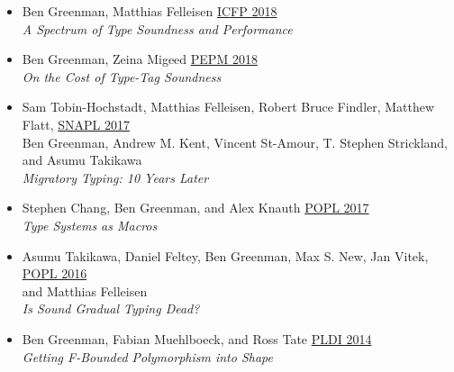 \documentclass[11pt]{article}
\begin{document}
\begin{itemize}
  Daniel Feltey, Ben Greenman, Christophe Scholliers, Robert Bruce Findler, \hfill \href{https://2018.splashcon.org/track/splash-2018-OOPSLA}{OOPSLA 2018} \\
  and Vincent St. Amour \\
  \emph{Collapsible Contracts: Fixing a Pathology of Gradual Typing} \hfill {}
\item
  Ben Greenman, Matthias Felleisen \hfill \href{https://icfp18.sigplan.org/}{ICFP 2018} \\
  \emph{A Spectrum of Type Soundness and Performance} \hfill {}
\item
  Ben Greenman, Zeina Migeed \hfill \href{https://popl18.sigplan.org/track/PEPM-2018}{PEPM 2018} \\
  \emph{On the Cost of Type-Tag Soundness} \hfill {} %
\item
  Sam Tobin-Hochstadt, Matthias Felleisen, Robert Bruce Findler, Matthew Flatt, \hfill \href{https://snapl.org/2017/}{SNAPL 2017} \\
  Ben Greenman, Andrew M. Kent, Vincent St-Amour, T. Stephen Strickland, \\
  and Asumu Takikawa \\
  \emph{Migratory Typing: 10 Years Later} \hfill {}
\item
  Stephen Chang, Ben Greenman, and Alex Knauth \hfill \href{https://popl17.sigplan.org/}{POPL 2017} \\
   \emph{Type Systems as Macros} \hfill {}
\item
  Asumu Takikawa, Daniel Feltey, Ben Greenman, Max S. New, Jan Vitek, \hfill \href{https://popl16.sigplan.org/}{POPL 2016} \\
   and Matthias Felleisen \\
   \emph{Is Sound Gradual Typing Dead?} \hfill {} %
\item
  Ben Greenman, Fabian Muehlboeck, and Ross Tate \hfill \href{https://conferences.inf.ed.ac.uk/pldi2014/}{PLDI 2014} \\
  \emph{Getting F-Bounded Polymorphism into Shape} \hfill {}
\end{itemize}
\end{document}
